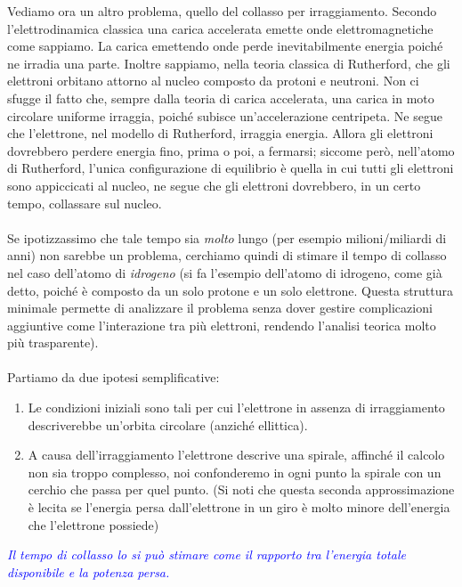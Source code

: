 	Vediamo ora un altro problema, quello del collasso per irraggiamento. Secondo l'elettrodinamica classica una carica accelerata emette onde elettromagnetiche come sappiamo. La carica emettendo onde perde inevitabilmente energia poiché ne irradia una parte. Inoltre sappiamo, nella teoria classica di Rutherford, che gli elettroni orbitano attorno al nucleo composto da protoni e neutroni. Non ci sfugge il fatto che, sempre dalla teoria di carica accelerata, una carica in moto circolare uniforme irraggia, poiché subisce un'accelerazione centripeta. Ne segue che l'elettrone, nel modello di Rutherford, irraggia energia. Allora gli elettroni dovrebbero perdere energia fino, prima o poi, a fermarsi; siccome però, nell'atomo di Rutherford, l'unica configurazione di equilibrio è quella in cui tutti gli elettroni sono appiccicati al nucleo, ne segue che gli elettroni dovrebbero, in un certo tempo, collassare sul nucleo. 
	\\
	\\
	Se ipotizzassimo che tale tempo sia \textit{molto} lungo (per esempio milioni/miliardi di anni) non sarebbe un problema, cerchiamo quindi di stimare il tempo di collasso nel caso dell’atomo di \textit{idrogeno} (si fa l'esempio dell'atomo di idrogeno, come già detto, poiché è composto da un solo protone e un solo elettrone. Questa struttura minimale permette di analizzare il problema senza dover gestire complicazioni aggiuntive come l'interazione tra più elettroni, rendendo l'analisi teorica molto più trasparente). 
	\\
	\\
	Partiamo da due ipotesi semplificative:
	
\begin{enumerate}
	\item Le condizioni iniziali sono tali per cui l'elettrone in assenza di irraggiamento descriverebbe un'orbita circolare (anziché ellittica).
	\item A causa dell'irraggiamento l'elettrone descrive una spirale, affinché il calcolo non sia troppo complesso, noi confonderemo in ogni punto la spirale con un cerchio che passa per quel punto. (Si noti che questa seconda approssimazione è lecita se l'energia persa dall'elettrone in un giro è molto minore dell'energia che l'elettrone possiede)
\end{enumerate}

	 \textcolor{blue}{\textit{Il tempo di collasso lo si può stimare come il rapporto tra l'energia totale disponibile e la potenza persa.}} 

